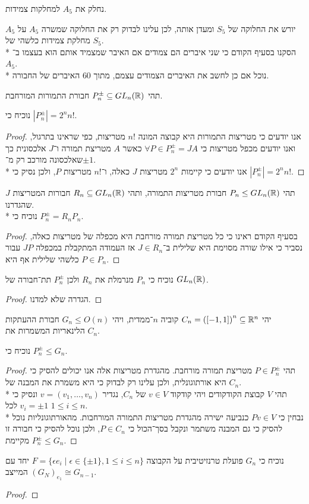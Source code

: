 \Subquestion{}
נחלק את $A_5$ למחלקות צמידות.

$A_5$ יורש את החלוקה של $S_5$ ומעדן אותה, לכן עלינו לבדוק רק את החלוקה שמשרה $A_5$ על מחלקת צמידות כלשהי של $S_5$. \\*
הסקנו בסעיף הקודם כי שני איברים הם צמודים אם האיבר שמצמיד אותם הוא בעצמו ב־$A_5$. \\*
נוכל אם כן לחשב את האיברים הצמודים עצמם, מתוך 60 האיברים של החבורה.

\Question{}
תהי $P_n^\pm \subseteq GL_n(\mathbb{R})$ חבורת התמורות המורחבת.

\Subquestion{}
נוכיח כי $|P_n^\pm| = 2^n n! $.
\begin{proof}
	אנו יודעים כי מטריצות התמורות היא קבוצה המונה $n! $ מטריצות, כפי שראינו בתרגול, ואנו יודעים מכפל מטריצות כי $\forall P \in P_n^\pm = J A$ כאשר $A$ מטריצת תמורה ו־$J$ אלכסונית כך שאלכסונה מורכב רק מ־$\pm1$. \\*
	אנו יודעים כי קיימות $2^n$ מטריצות $J$ כאלה, ו־$n! $ מטריצות $P$, ולכן נסיק כי $|P_n^\pm| = 2^n n! $.
\end{proof}

\Subquestion{}
תהי $P_n \le GL_n(\mathbb{R})$ חבורת מטריצות התמורה, ותהי $R_n \subseteq GL_n(\mathbb{R})$ חבורות המטריצות $J$ שהגדרנו. \\*
נוכיח כי $P_n^\pm = R_n P_n$.
\begin{proof}
	בסעיף הקודם ראינו כי כל מטריצת תמורה מורחבת היא מכפלה של מטריצות כאלה, נסביר כי אילו שורה מסוימת היא שלילית ב־$J \in R_n$ אז העמודה המתקבלת במכפלה $J P$ עבור $P \in P_n$ כלשהי שלילית אף היא.
\end{proof}

\Subquestion{}
נוכיח כי $P_n$ מנרמלת את $R_n$ ולכן $P_n^\pm$ תת־חבורה של $GL_n(\mathbb{R})$.
\begin{proof}
	הגדרה שלא למדנו.
\end{proof}

\Question{}
יהי $C_n = {([-1, 1])}^n \subseteq \mathbb{R}^n$ קוביה $n$־ממדית, ויהי $G_n \le O(n)$ חבורת ההעתקות הלינאריות המשמרות את $C_n$.

\Subquestion{}
נוכיח כי $P_n^\pm \le G_n$.
\begin{proof}
	תהי $P \in P_n^\pm$ מטריצת תמורה מורחבת. מהגדרת מטריצות אלה אנו יכולים להסיק כי היא אורתוגונלית, ולכן עלינו רק לבדוק כי היא משמרת את המבנה של $C_n$. \\*
	תהי $V$ קבוצת הקודקודים ויהי קודקוד $v \in V$ של $C_n$, נגדיר $v = (v_1, \dots, v_n)$ ונסיק כי $v_i = \pm 1$ לכל $1 \le i \le n$. \\*
	נבחין כי $P v \in V$ כנביעה ישירה מהגדרת מטריצות התמורה המורחבות.
	מהאורתוגונליות נוכל להסיק כי גם המבנה משתמר ונקבל בסך־הכול כי $P \in C_n$, ולכן נוכל להסיק כי חבורה זו מקיימת $P_n^\pm \le G_n$.
\end{proof}

\Subquestion{}
נוכיח כי $G_n$ פועלת טרנזיטיבית על הקבוצה $F = \{ \epsilon e_i \mid \epsilon \in \{ \pm 1 \}, 1 \le i \le n \}$ יחד עם המייצב ${(G_N)}_{e_1} \cong G_{n - 1}$.
\begin{proof}
	
\end{proof}


